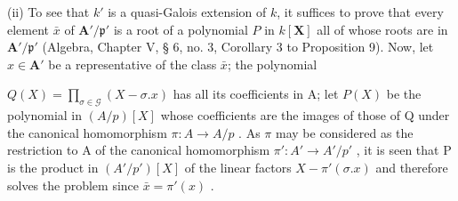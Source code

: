 (ii) To see that \(k'\) is a quasi-Galois extension of \(k\), it suffices to prove that every element \(\bar{x}\) of \(\mathbf{A}'/\mathfrak{p}'\) is a root of a polynomial \(P\) in \(k[\mathbf{X}]\) all of whose roots are in \(\mathbf{A}'/\mathfrak{p}'\) (Algebra, Chapter V, § 6, no. 3, Corollary 3 to Proposition 9). Now, let \(x \in \mathbf{A}'\) be a representative of the class \(\bar{x}\); the polynomial

\(Q(X) = \prod_{\sigma \in \mathcal{G}} (X - \sigma.x)\) has all its coefficients in A; let \(P(X)\) be the polynomial in \((A/p)[X]\) whose coefficients are the images of those of Q under the canonical homomorphism \(\pi: A \to A/p\) . As \(\pi\) may be considered as the restriction to A of the canonical homomorphism \(\pi': A' \to A'/p'\) , it is seen that P is the product in \((A'/p')[X]\) of the linear factors \(X - \pi'(\sigma.x)\) and therefore solves the problem since \(\bar{x} = \pi'(x)\) .

